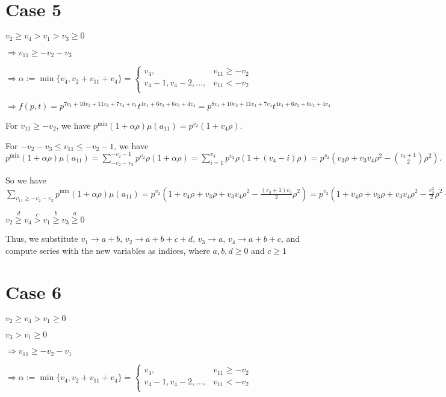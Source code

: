 \documentclass{article}
\begin{document}
\section{Case 5}
$v_2\geq{v_4}>v_1>v_3\geq{0}$

$\Rightarrow{v_{11}}\geq{-v_2-v_3}$

$\Rightarrow\alpha:=\min\{v_4,v_2+v_{11}+v_4\}=\begin{cases}
       v_4, & v_{11}\geq{-v_2}\\
       v_4-1,v_4-2,\dots, & v_{11}<{-v_2}\\
     \end{cases}$

     $\Rightarrow{f(p,t)=p^{7v_1+10v_2+11v_3+7v_4+v_1}t^{4v_1+6v_2+6v_3+4v_4}=p^{8v_1+10v_2+11v_3+7v_4}t^{4v_1+6v_2+6v_3+4v_4}}$

For $v_{11}\geq{-v_2}$, we have $p^{\min}(1+\alpha\rho)\mu(a_{11})=p^{v_2}(1+v_4\rho).$

For $-v_2-v_3\leq{v_{11}}\leq{-v_2-1}$, we have $p^{\min}(1+\alpha\rho)\mu(a_{11})=\sum_{-v_2-v_3}^{-v_2-1}p^{v_2}\rho(1+\alpha\rho)=\sum_{i=1}^{v_3}p^{v_2}\rho(1+(v_4-i)\rho)=p^{v_2}(v_3\rho+v_3v_4\rho^2-\binom{v_3+1}{2}\rho^2).$

So we have $\sum_{v_{11}\geq{-v_2-v_3}}p^{\min}(1+\alpha\rho)\mu(a_{11})=p^{v_2}(1+v_4\rho+v_3\rho+v_3v_4\rho^2-\frac{(v_3+1)v_3}{2}\rho^2)=p^{v_2}(1+v_4\rho+v_3\rho+v_3v_4\rho^2-\frac{v_3^2}{2}\rho^2-\frac{v_3}{2}\rho^2).$

$v_2\overset{d}{\geq}v_4\overset{c}{>}v_1\overset{b}{\geq}{v_3}\overset{a}{\geq}{0}$

Thus, we substitute 
$v_1\rightarrow{a+b}$, 
$v_2\rightarrow{a+b+c+d}$, 
$v_3\rightarrow{a}$, 
$v_4\rightarrow{a+b+c}$, and compute series with the new variables as indices, where $a,b,d\geq{0}$ and $c\geq{1}$

\section{Case 6}
$v_2\geq{v_4}>v_1\geq{0}$

$v_3>v_1\geq{0}$

$\Rightarrow{v_{11}}\geq{-v_2-v_1}$

$\Rightarrow\alpha:=\min\{v_4,v_2+v_{11}+v_4\}=\begin{cases}
       v_4, & v_{11}\geq{-v_2}\\
       v_4-1,v_4-2,\dots, & v_{11}<{-v_2}\\
     \end{cases}$
\end{document}
